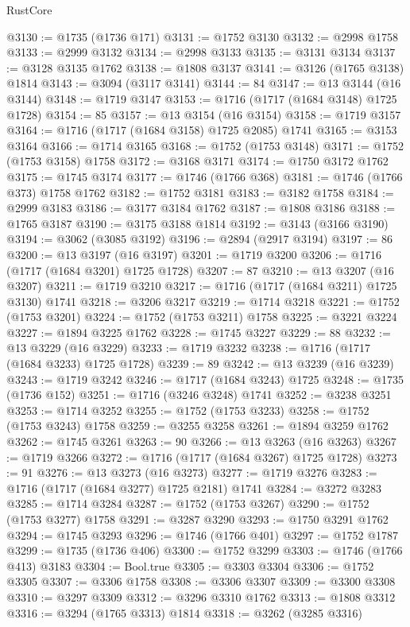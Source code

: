 \begin{lexlean}{RustCore}
\begin{coremodule}
@3130 := @1735 (@1736 @171)
@3131 := @1752 @3130
@3132 := @2998 @1758
@3133 := @2999 @3132
@3134 := @2998 @3133
@3135 := @3131 @3134
@3137 := @3128 @3135 @1762
@3138 := @1808 @3137
@3141 := @3126 (@1765 @3138) @1814
@3143 := @3094 (@3117 @3141)
@3144 := 84
@3147 := @13 @3144 (@16 @3144)
@3148 := @1719 @3147
@3153 := @1716 (@1717 (@1684 @3148) @1725 @1728)
@3154 := 85
@3157 := @13 @3154 (@16 @3154)
@3158 := @1719 @3157
@3164 := @1716 (@1717 (@1684 @3158) @1725 @2085) @1741
@3165 := @3153 @3164
@3166 := @1714 @3165
@3168 := @1752 (@1753 @3148)
@3171 := @1752 (@1753 @3158) @1758
@3172 := @3168 @3171
@3174 := @1750 @3172 @1762
@3175 := @1745 @3174
@3177 := @1746 (@1766 @368)
@3181 := @1746 (@1766 @373) @1758 @1762
@3182 := @1752 @3181
@3183 := @3182 @1758
@3184 := @2999 @3183
@3186 := @3177 @3184 @1762
@3187 := @1808 @3186
@3188 := @1765 @3187
@3190 := @3175 @3188 @1814
@3192 := @3143 (@3166 @3190)
@3194 := @3062 (@3085 @3192)
@3196 := @2894 (@2917 @3194)
@3197 := 86
@3200 := @13 @3197 (@16 @3197)
@3201 := @1719 @3200
@3206 := @1716 (@1717 (@1684 @3201) @1725 @1728)
@3207 := 87
@3210 := @13 @3207 (@16 @3207)
@3211 := @1719 @3210
@3217 := @1716 (@1717 (@1684 @3211) @1725 @3130) @1741
@3218 := @3206 @3217
@3219 := @1714 @3218
@3221 := @1752 (@1753 @3201)
@3224 := @1752 (@1753 @3211) @1758
@3225 := @3221 @3224
@3227 := @1894 @3225 @1762
@3228 := @1745 @3227
@3229 := 88
@3232 := @13 @3229 (@16 @3229)
@3233 := @1719 @3232
@3238 := @1716 (@1717 (@1684 @3233) @1725 @1728)
@3239 := 89
@3242 := @13 @3239 (@16 @3239)
@3243 := @1719 @3242
@3246 := @1717 (@1684 @3243) @1725
@3248 := @1735 (@1736 @152)
@3251 := @1716 (@3246 @3248) @1741
@3252 := @3238 @3251
@3253 := @1714 @3252
@3255 := @1752 (@1753 @3233)
@3258 := @1752 (@1753 @3243) @1758
@3259 := @3255 @3258
@3261 := @1894 @3259 @1762
@3262 := @1745 @3261
@3263 := 90
@3266 := @13 @3263 (@16 @3263)
@3267 := @1719 @3266
@3272 := @1716 (@1717 (@1684 @3267) @1725 @1728)
@3273 := 91
@3276 := @13 @3273 (@16 @3273)
@3277 := @1719 @3276
@3283 := @1716 (@1717 (@1684 @3277) @1725 @2181) @1741
@3284 := @3272 @3283
@3285 := @1714 @3284
@3287 := @1752 (@1753 @3267)
@3290 := @1752 (@1753 @3277) @1758
@3291 := @3287 @3290
@3293 := @1750 @3291 @1762
@3294 := @1745 @3293
@3296 := @1746 (@1766 @401)
@3297 := @1752 @1787
@3299 := @1735 (@1736 @406)
@3300 := @1752 @3299
@3303 := @1746 (@1766 @413) @3183
@3304 := Bool.true
@3305 := @3303 @3304
@3306 := @1752 @3305
@3307 := @3306 @1758
@3308 := @3306 @3307
@3309 := @3300 @3308
@3310 := @3297 @3309
@3312 := @3296 @3310 @1762
@3313 := @1808 @3312
@3316 := @3294 (@1765 @3313) @1814
@3318 := @3262 (@3285 @3316)

\end{coremodule}
\end{lexlean}
